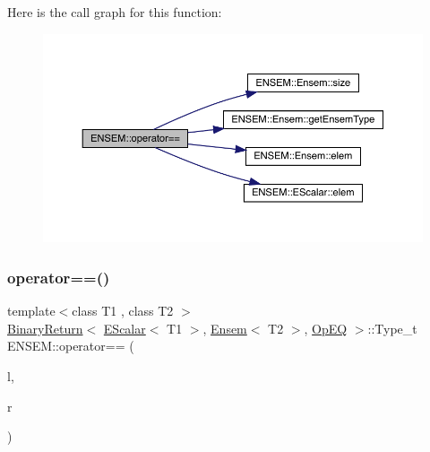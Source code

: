 Here is the call graph for this function\+:\nopagebreak
\begin{figure}[H]
\begin{center}
\leavevmode
\includegraphics[width=350pt]{d1/d9e/group__eensem_ga4b52007b3c1511c746a46b46e5b145b1_cgraph}
\end{center}
\end{figure}
\mbox{\label{group__eensem_gade522cbdb1f590216dd1c5e3dd034e79}} 
\subsubsection{\texorpdfstring{operator==()}{operator==()}\hspace{0.1cm}{\footnotesize\ttfamily [3/3]}}
{\footnotesize\ttfamily template$<$class T1 , class T2 $>$ \\
\mbox{\hyperlink{structENSEM_1_1BinaryReturn}{Binary\+Return}}$<$ \mbox{\hyperlink{classENSEM_1_1EScalar}{E\+Scalar}}$<$ T1 $>$, \mbox{\hyperlink{classENSEM_1_1Ensem}{Ensem}}$<$ T2 $>$, \mbox{\hyperlink{structENSEM_1_1OpEQ}{Op\+EQ}} $>$\+::Type\+\_\+t E\+N\+S\+E\+M\+::operator== (\begin{DoxyParamCaption}\item[{const \mbox{\hyperlink{classENSEM_1_1EScalar}{E\+Scalar}}$<$ T1 $>$ \&}]{l,  }\item[{const \mbox{\hyperlink{classENSEM_1_1Ensem}{Ensem}}$<$ T2 $>$ \&}]{r }\end{DoxyParamCaption})\hspace{0.3cm}{\ttfamily [inline]}}

